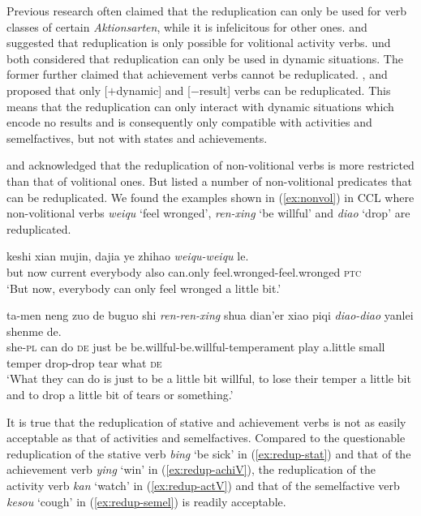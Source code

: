 Previous research often claimed that the reduplication can only be used for verb classes of certain \textit{Aktionsarten}, while it is infelicitous for other ones.
\citet[277--278]{Hong1999} and \citet[234--235]{LiThompson1981} suggested that reduplication is only possible for volitional activity verbs.
\citet[70--71]{Dai1997} und \citet[290]{Tsao2001} both considered that reduplication can only be used in dynamic situations.
The former further claimed that achievement verbs cannot be reduplicated.
 \citet[155]{XiaoMcEnery2004}, \citet[20]{Arcodiaetal2014} and \citet{BascianoMelloni2017} proposed that only [$+$dynamic] and [$-$result] verbs can be reduplicated.
This means that the reduplication can only interact with dynamic situations which encode no results and is consequently only compatible with activities and semelfactives, but not with states and achievements.

\citet[53]{Chen2001} and \citet[10--11]{Yang2003} acknowledged that the reduplication of non\hyp{}vo\-li\-tion\-al verbs is more restricted than that of volitional ones.
But \citet[381--382]{Zhu1998} listed a number of non\hyp{}volitional predicates that can be reduplicated.
We found the examples shown in (\ref{ex:nonvol}) in {CCL} where non\nobreakdash-vo\-li\-tion\-al verbs \textit{weiqu} `feel wronged', \textit{ren-xing} `be willful' and \textit{diao} `drop' are reduplicated.

\settowidth{}

\begin{sloppypar}
\ea\label{ex:nonvol}
\ea
\gll keshi xian mujin, dajia ye zhihao \textit{weiqu-weiqu} le.\\
but now current everybody also can.only feel.wronged-feel.wronged \textsc{ptc}\\ 
\glt `But now, everybody can only feel wronged a little bit.'

\ex
\gll ta-men neng zuo de buguo shi \textit{ren-ren-xing} shua dian'er xiao piqi \textit{diao-diao} yanlei shenme de.\\
she-\textsc{pl} can do \textsc{de} just be be.willful-be.willful-temperament play a.little small temper drop-drop tear what \textsc{de}\\ 
\glt `What they can do is just to be a little bit willful, to lose their temper a little bit and to drop a little bit of tears or something.'
\z
\z
\end{sloppypar}

It is true that  the reduplication of stative and achievement verbs is not as easily acceptable as that of activities and semelfactives.
Compared to the questionable reduplication of the stative verb \textit{bing} `be sick' in (\ref{ex:redup-stat})
and that of the achievement verb \textit{ying} `win' in (\ref{ex:redup-achiV}), 
the reduplication of the activity verb \textit{kan} `watch' in (\ref{ex:redup-actV})
and that of the semelfactive verb \textit{kesou} `cough' in (\ref{ex:redup-semel}) is readily acceptable.

